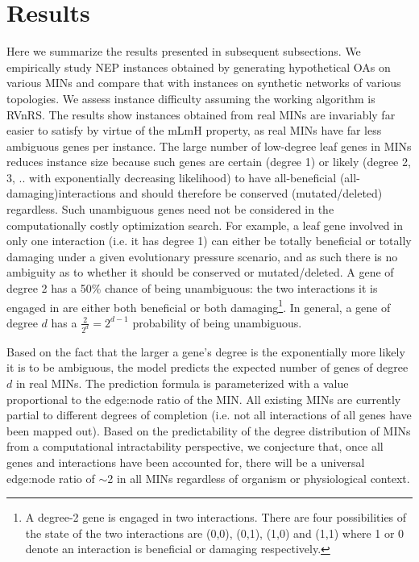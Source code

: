 \section{Results}
    Here we summarize the results presented in subsequent subsections. We empirically study NEP instances obtained by generating hypothetical OAs on various MINs and compare that with instances on synthetic networks of various topologies. We assess instance difficulty assuming the working algorithm is RVnRS. The results show instances obtained from  real MINs are invariably far easier to satisfy by virtue of the mLmH property, as real MINs have far less ambiguous genes per instance. The large number of low-degree leaf genes in MINs reduces  instance size because such genes are certain (degree 1) or likely (degree 2, 3, .. with exponentially decreasing likelihood) to have all-beneficial  (all-damaging)interactions and should therefore be conserved (mutated/deleted) regardless. Such unambiguous genes need not be considered in the computationally costly optimization search. For example, a leaf gene involved in only one interaction (i.e. it has degree 1)  can either be totally beneficial or totally damaging  under a given evolutionary pressure scenario, and as such there is no ambiguity as to whether it should be conserved or mutated/deleted. A gene of degree 2 has a 50\% chance of being unambiguous: the two interactions it is engaged in are either both beneficial or both damaging\footnote{
        A degree-2 gene is engaged in two interactions. There are four possibilities of the state of the two interactions are (0,0), (0,1), (1,0) and (1,1) where 1 or 0 denote an interaction is beneficial or damaging respectively.
    }.  In general, a gene of degree $d$ has a $\frac{2}{2^d} = 2^{d-1}$ probability of being unambiguous.


    Based on the fact that the larger a gene's degree is the exponentially more likely it is to be ambiguous,  the model predicts the expected number of genes of degree $d$ in real MINs. The prediction formula is parameterized with a value proportional to the  edge:node ratio of the MIN. All existing MINs are currently partial to different degrees of completion (i.e. not all interactions of all genes have been mapped out). Based on the predictability of the degree distribution of MINs from a computational intractability perspective, we conjecture that, once all genes and interactions have been accounted for, there will be a universal  edge:node ratio of ${\sim}$2 in all MINs regardless of organism or physiological context.


